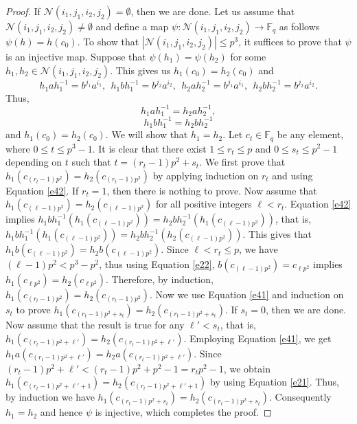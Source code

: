 \documentclass[11pt]{amsart}
\theoremstyle{plain}
\numberwithin{equation}{section}
\def\F{{\mathbb F}}
\begin{document}
\begin{proof} If $\mathcal{N}(i_1,j_1,i_2,j_2)=\emptyset$, then we are done. Let us assume that $\mathcal{N}(i_1,j_1,i_2,j_2) \neq \emptyset$ and define a map $\psi: \mathcal{N}(i_1,j_1,i_2,j_2) \rightarrow \F_q$ as follows $\psi(h)=h(c_0)$. To show that $|\mathcal{N}(i_1,j_1,i_2,j_2)| \leq  p^3$, it suffices to prove that $\psi$ is an injective map. Suppose that $\psi(h_1)=\psi(h_2)$ for some $h_1,h_2 \in \mathcal{N}(i_1,j_1,i_2,j_2)$. This gives us $h_1(c_0)=h_2(c_0)$ and $$h_1ah_1^{-1}=b^{j_1}a^{i_1},~~ h_1bh_1^{-1}=b^{j_2}a^{i_2}, ~~h_2ah_2^{-1}=b^{j_1}a^{i_1},~~ h_2bh_2^{-1}=b^{j_2}a^{i_2}.$$ Thus, 
\begin{equation}\label{e41}
h_1ah_1^{-1}=h_2ah_2^{-1},
\end{equation}
\begin{equation}\label{e42}
 h_1bh_1^{-1}=h_2bh_2^{-1}
 \end{equation}
  and $h_1(c_0)=h_2(c_0)$. We will show that $h_1=h_2$. Let $c_t \in \F_q$ be any element, where $0 \leq t \leq p^3-1$. It is clear that there exist $1 \leq r_t \leq p$ and $0 \leq s_t \leq p^2-1$ depending on $t$ such that $t=(r_t-1)p^2+s_t$. We first prove that $h_1(c_{(r_t-1)p^2})=h_2(c_{(r_t-1)p^2})$ by applying induction on $r_t$ and using Equation \eqref{e42}. If $r_t=1$, then there is nothing to prove. Now assume that $h_1(c_{(\ell-1)p^2})=h_2(c_{(\ell-1)p^2})$ for all positive integers $\ell <r_t$. Equation \eqref{e42} implies $ h_1bh_1^{-1}(h_1(c_{(\ell-1)p^2}))=h_2bh_2^{-1}(h_1(c_{(\ell-1)p^2}))$, that is, $ h_1bh_1^{-1}(h_1(c_{(\ell-1)p^2}))=h_2bh_2^{-1}(h_2(c_{(\ell-1)p^2}))$. This gives that $ h_1b(c_{(\ell-1)p^2})=h_2b(c_{(\ell-1)p^2})$. Since $\ell <r_t\leq p$, we have $(\ell-1)p^2<p^3-p^2$, thus using Equation \eqref{e22}, $b(c_{(\ell-1)p^2})=c_{\ell p^2}$ implies $h_1(c_{\ell p^2})=h_2(c_{\ell p^2})$. Therefore, by induction, $h_1(c_{(r_t-1)p^2})=h_2(c_{(r_t-1)p^2})$. Now we use Equation \eqref{e41} and induction on $s_t$ to prove $h_1(c_{(r_t-1)p^2+s_t})=h_2(c_{(r_t-1)p^2+s_t})$. If $s_t=0$, then we are done. Now assume that the result is true for any $\ell'<s_t$, that is, $h_1(c_{(r_t-1)p^2+\ell'})=h_2(c_{(r_t-1)p^2+\ell'})$. Employing Equation \eqref{e41}, we get $h_1a(c_{(r_t-1)p^2+\ell'})=h_2a(c_{(r_t-1)p^2+\ell'})$. Since $(r_t-1)p^2+\ell'<(r_t-1)p^2+p^2-1=r_tp^2-1$, we obtain $h_1(c_{(r_t-1)p^2+\ell'+1})=h_2(c_{(r_t-1)p^2+\ell'+1})$ by using Equation \eqref{e21}. Thus, by induction we have $h_1(c_{(r_t-1)p^2+s_t})=h_2(c_{(r_t-1)p^2+s_t})$. Consequently $h_1=h_2$ and hence $\psi$ is injective, which completes the proof.
  

\end{proof}
\end{document}
